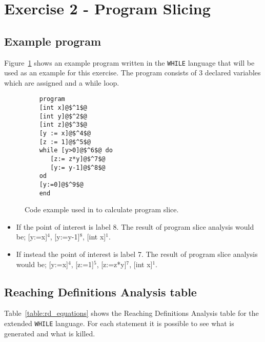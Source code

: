 \section{Exercise 2 - Program Slicing}

\subsection{Example program}
Figure~\ref{fig:codeexample} shows an example program written in the \texttt{WHILE} language that will be used as an example for this exercise. The program consists of 3 declared variables which are assigned and a while loop.
\begin{figure}
	\label{fig:codeexample}
	\begin{lstlisting}
	program
	[int x]@$^1$@
	[int y]@$^2$@
	[int z]@$^3$@
	[y := x]@$^4$@
	[z := 1]@$^5$@
	while [y>0]@$^6$@ do
	   [z:= z*y]@$^7$@
	   [y:= y-1]@$^8$@
	od
	[y:=0]@$^9$@
	end
	\end{lstlisting}
	\caption{Code example used in to calculate program slice.}
\end{figure}

\begin{itemize}
	\item If the point of interest is label 8. The result of program slice analysis would be; [y:=x]$^4$, [y:=y-1]$^8$, [int x]$^1$.
	\item If instead the point of interest is label 7.  The result of program slice analysis would be; [y:=x]$^4$, [z:=1]$^5$, [z:=z*y]$^7$, [int x]$^1$.
\end{itemize}

\subsection{Reaching Definitions Analysis table}
Table~\ref{table:rd_equations} shows the Reaching Definitions Analysis table for the extended \texttt{WHILE} language. For each statement it is possible to see what is generated and what is killed.

